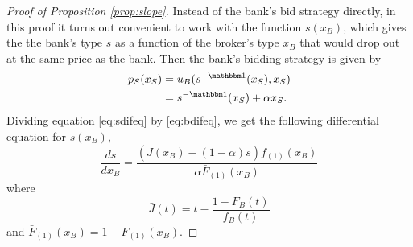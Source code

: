 \documentclass[11pt,twopage]{article}
\begin{document}
\begin{proof}[Proof of Proposition \ref{prop:slope}]
Instead of the bank's bid strategy directly, in this proof it turns out convenient to work with the function $s(x_B)$, which gives the the bank's type $s$ as a function of the broker's type $x_B$ that would drop out at the same price as the bank. Then the bank's bidding strategy is given by
\begin{align}
p_S(x_S) &= u_B(s^{-\mathbbm 1}(x_S),x_S) \\&=  s^{-\mathbbm 1}(x_S)+\alpha  x_S .
 \end{align}
Dividing equation \eqref{eq:sdifeq} by \eqref{eq:bdifeq}, we get the following differential equation for $s(x_B)$,
\[    
\frac{ds}{dx_B} = \frac{(\bar J(x_B) - (1-\alpha) s)f_{(1)}(x_B)}{\alpha \bar F_{(1)}(x_B)}
\]
where \[ \bar J(t) = t-\frac{1-F_B(t)}{f_B(t)} \] and $\bar F_{(1)}(x_B) = 1- F_{(1)}(x_B)$.


\end{proof}
\end{document}
